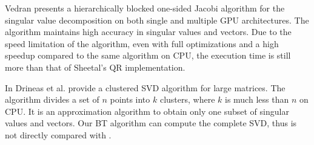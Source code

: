 Vedran\cite{14arxivjacobi} presents a hierarchically blocked one-sided Jacobi algorithm for the singular value decomposition on both single and multiple GPU architectures. 
The algorithm maintains high accuracy in singular values and vectors. Due to the speed limitation of the algorithm, even with full optimizations and a high speedup compared to the same algorithm on CPU, the execution time is still more than that of Sheetal's QR implementation.


In \cite{99clustering} Drineas et al. provide a clustered SVD algorithm for large matrices. The algorithm divides a set of $n$ points into $k$ clusters, where $k$ is much less than $n$ on CPU.
It is an approximation algorithm to obtain only one subset of singular values
and vectors. Our BT algorithm can compute the complete SVD, thus is not
directly compared with \cite{99clustering}. 

